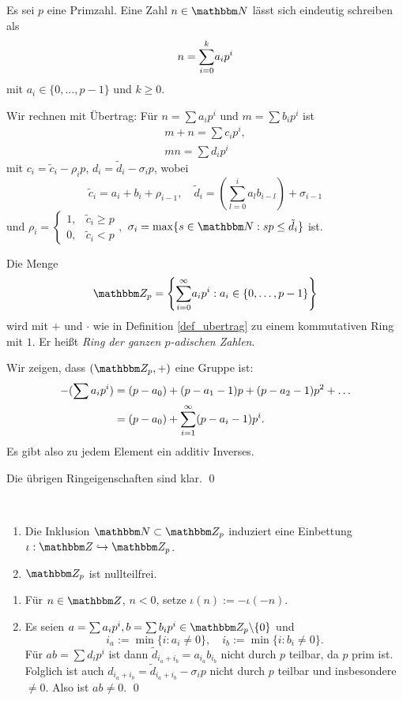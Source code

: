 \documentclass[a4paper, 12pt, twoside]{article}
\begin{document}
Es sei $p$ eine Primzahl. Eine Zahl $n\in\NN$ lässt sich eindeutig
schreiben als
\[
n = \overset{k}{\underset{i=0}{\mathop{\sum}}} a_i p^i
\]
mit $a_i\in\{0,\ldots,p-1\}$ und $k\geq 0$.

\BEM\label{def_ubertrag}
Wir rechnen mit Übertrag: Für $n=\sum a_i p^i$ und
$m=\sum b_i p^i$ ist
\begin{gather*}
m+n = \sum c_i p^i, \\
mn = \sum d_i p^i
\end{gather*}
mit
$c_i = \tilde{c}_i - \rho_i p$,
$d_i = \tilde{d}_i - \sigma_i p$,
wobei 
\[
\tilde{c}_i=a_i+b_i+\rho_{i-1},\quad
\tilde{d}_i=(\sum_{l=0}^i a_l b_{i-l})+\sigma_{i-1}
\]
und
$\rho_i = \left\{\begin{matrix}
1, & \tilde{c}_i \geq p \\
0, & \tilde{c}_i < p
\end{matrix}\right.,$
$\sigma_i=\max\{s\in\NN:sp\leq \tilde{d}_i\}$
ist.

\DB Die Menge
\[
\ZZ_p = \left\{
\SUM{\infty}{i=0} a_i p^i : a_i \in \{0,\ldots,p-1\}
\right\}
\]
wird mit $+$ und $\cdot$ wie in Definition \ref{def_ubertrag}
zu einem kommutativen Ring mit $1$. Er heißt
\emph{Ring der ganzen $p$-adischen Zahlen}.

\bew Wir zeigen, dass $(\ZZ_p,+)$ eine Gruppe ist:
\begin{align*}
-(\sum a_i p^i) &= (p-a_0) + (p-a_1-1) p + (p-a_2-1) p^2 + \ldots \\
&= (p-a_0) + \overset{\infty}{\underset{i=1}{\mathop{\sum}}} (p-a_i-1) p^i.
\end{align*}
Es gibt also zu jedem Element ein additiv Inverses.

Die übrigen Ringeigenschaften sind klar.
\qed

\PROP\ \begin{enumerate}
\item Die Inklusion $\NN\subset \ZZ_p$ induziert eine Einbettung
$\iota:\ZZ\hookrightarrow \ZZ_p$.
\item $\ZZ_p$ ist nullteilfrei.
\end{enumerate}
\bew \begin{enumerate}
\item Für $n\in\ZZ$, $n<0$, setze $\iota(n):=-\iota(-n)$.
\item Es seien $a=\sum a_i p^i, b=\sum b_i p^i \in \ZZ_p\backslash\{0\}$ und
\[
i_a := \min\{i:a_i \neq 0\},\quad
i_b := \min\{i:b_i \neq 0\}.
\]
Für $ab=\sum d_i p^i$ ist dann $\tilde{d}_{i_a+i_b}=a_{i_a}b_{i_b}$
nicht durch $p$ teilbar, da $p$ prim ist.
Folglich ist auch $d_{i_a+i_b}=\tilde{d}_{i_a+i_b}-\sigma_i p$
nicht durch $p$ teilbar und insbesondere $\neq 0$.
Also ist $ab\neq 0$.
\qed
\end{enumerate}
\end{document}
